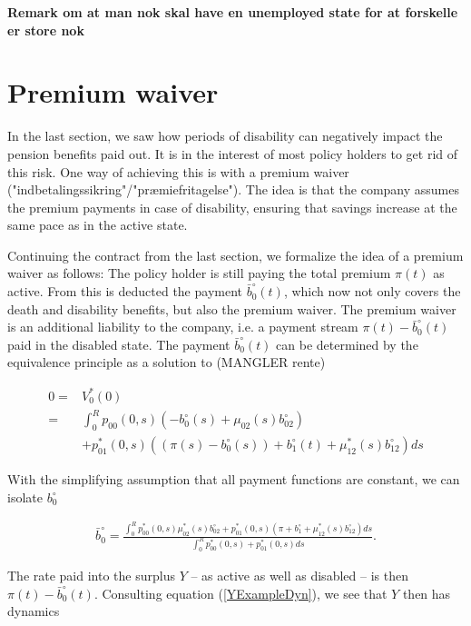 \documentclass{book}
\newcommand{\1}[1]{\mathbbm{1}_{\left\lbrace #1 \right\rbrace}}
\theoremstyle{break}
\theoremstyle{remark}
\numberwithin{equation}{section}
\begin{document}
\textbf{Remark om at man nok skal have en unemployed state for at forskelle er store nok}

\section{Premium waiver}

In the last section, we saw how periods of disability can negatively impact the pension benefits paid out. It is in the interest of most policy holders to get rid of this risk. One way of achieving this is with a premium waiver ("indbetalingssikring"/"præmiefritagelse"). The idea is that the company assumes the premium payments in case of disability, ensuring that savings increase at the same pace as in the active state.

Continuing the contract from the last section, we formalize the idea of a premium waiver as follows: The policy holder is still paying the total premium $\pi(t)$ as active. From this is deducted the payment $\bar{b}_0^\circ(t)$, which now not only covers the death and disability benefits, but also the premium waiver. The premium waiver is an additional liability to the company, i.e. a payment stream $\pi(t) - \bar{b}_0^\circ(t)$ paid in the disabled state. The payment $\bar{b}_0^\circ(t)$ can be determined by the equivalence principle as a solution to (MANGLER rente)

\begin{align*}
	0 =& V_0^*(0) \\
	=& \int_0^R p_{00}(0,s) \left( - b_0^\circ(s)  + \mu_{02}(s) b_{02}^\circ \right) \\
	&+ p_{01}^*(0,s) \left( \left( \pi(s) - b_0^\circ(s) \right) + b_1^\circ(t) + \mu_{12}^*(s) b_{12}^\circ \right) ds
\end{align*}

With the simplifying assumption that all payment functions are constant, we can isolate $b_0^\circ$

\begin{align*}
	\bar{b}_0^\circ = \frac{\int_0^R p_{00}^*(0,s) \mu_{02}^*(s) b_{02}^\circ + p_{01}^*(0,s) \left( \pi + b_1^\circ + \mu_{12}^*(s) b_{12}^\circ \right) ds}{\int_0^R p_{00}^*(0,s) + p_{01}^*(0,s)ds}.
\end{align*}

The rate paid into the surplus $Y$ -- as active as well as disabled -- is then $\pi(t) - \bar{b}_0^\circ(t)$. Consulting equation (\ref{YExampleDyn}), we see that $Y$ then has dynamics
\end{document}
